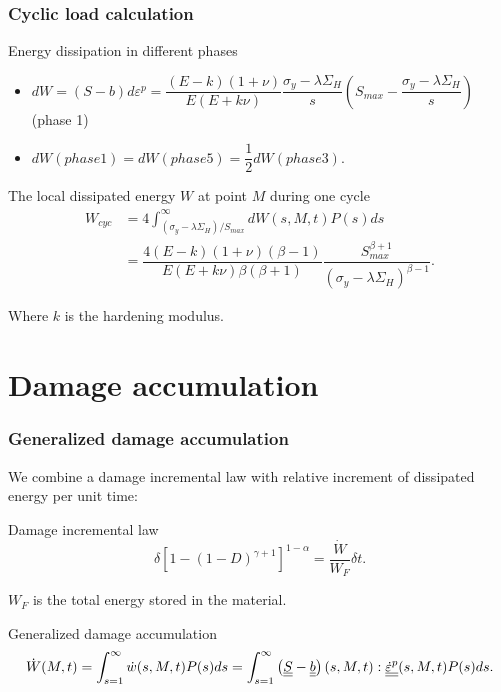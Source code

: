 \documentclass[xcolor=table]{Bredelebeamer}
\begin{document}
\begin{frame}
	\frametitle{Cyclic load calculation}	
	\begin{block}{Energy dissipation in different phases}
		\begin{itemize}
			\item $dW=(S-b)d\varepsilon^p=\dfrac{(E-k)(1+\nu) }{E(E+k\nu)}\dfrac{\sigma_y-\lambda \Sigma_H}{s}\left(S_{max}-\dfrac{\sigma_y-\lambda \Sigma_H}{s}\right)
			$ (phase 1)
			
			\vspace{6pt}
			\item $dW(phase 1)=dW(phase 5)=\dfrac{1}{2}dW(phase 3).$
	    \end{itemize}	
	\end{block}
	\begin{block}{The local dissipated energy $W$  at point $M$ during one cycle}
		\begin{equation}
		\begin{split}
		W_{cyc}&=4\int_{\left( \sigma_y-\lambda \Sigma_H\right) /S_{max}}^{\infty}dW(s,M,t)P(s)ds
		\\&=\dfrac{4(E-k)(1+\nu)\left( \beta-1\right) }{ E(E+k\nu)\beta\left( \beta+1\right) }\dfrac{S_{max}^{\beta+1}}{\left( \sigma_y-\lambda \Sigma_H\right) ^{\beta-1}}.
		\end{split}
		\end{equation}
	\end{block}
	
	Where $k$ is the hardening modulus.
\end{frame}	


\section{Damage accumulation}
\begin{frame}
	\frametitle{Generalized damage accumulation}	
	We combine a damage incremental law with relative increment of dissipated energy per unit time:
	\begin{block}{Damage incremental law}	
\begin{equation}
	\delta [1-(1-D)^{\gamma+1}]^{1-\alpha}=\dfrac{\dot{W}}{W_F}\delta t.
	\label{dt}
\end{equation}
	\end{block}
	$W_F$ is the total energy stored in the material.	
		\begin{block}{ Generalized damage accumulation}	
\begin{equation}\dot{W}(M,t)=\int_{s=1}^{\infty}\dot{w}(s,M,t)P(s)ds=\int_{s=1}^{\infty}\left(\uline{\uline{S}}-\uline{\uline{b}} \right) (s,M,t):\uline{\uline{\dot{\varepsilon}^p}}(s,M,t)P(s)ds.
\end{equation}
		\end{block}
\end{frame}	
\end{document}
